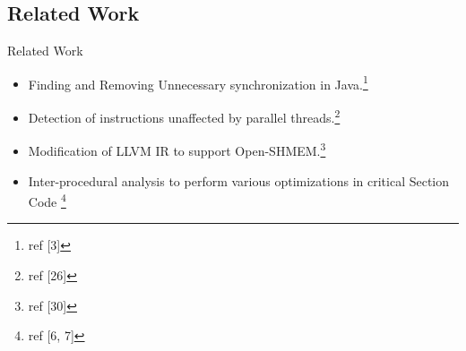 \documentclass{beamer}
\begin{document}
\subsection{Related Work}
\begin{frame}{Related Work}
    \begin{itemize}
    \item Finding and Removing Unnecessary synchronization in Java.\footnote{ref [3]}
    \item Detection of instructions unaffected by parallel threads.\footnote{ref [26]}
    \item  Modification of  LLVM  IR  to  support  Open-SHMEM.\footnote{ref [30]}
    \item  Inter-procedural  analysis  to  perform various optimizations in critical Section Code \footnote{ref [6, 7]}
    \end{itemize}
    
\end{frame}
\end{document}
